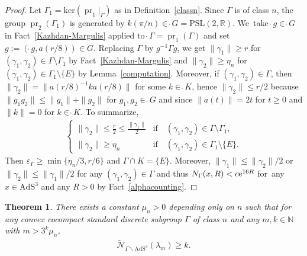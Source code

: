 \documentclass[10pt,a4paper]{amsart}
\numberwithin{equation}{section}
\newtheorem{Theorem}{Theorem}[section]
\begin{document}
\begin{proof}
Let $\Gamma_1=\mathrm{ker}(\operatorname{pr}_{1}|_{\Gamma})$
as in Definition~\ref{classn}.
Since $\Gamma$ is of class $n$,
the group $\operatorname{pr}_{2}(\Gamma_{1})$ is generated by
$k(\pi/n)\in \grave{\ }G=\mathrm{PSL}(2,\mathbb{R})$. We~take $\grave{\ }g \in \grave{\ }G$ in Fact~\ref{Kazhdan-Margulis} applied
to $\grave{\ }\Gamma=\operatorname{pr}_{1}(\Gamma)$ and
set $g:=(\grave{\ }g,a(r/8))\in G$.
Replacing $\Gamma$ by $g^{-1}\Gamma g$, we get
$\|\gamma_{1}\|\geq r$ for
$(\gamma_{1},\gamma_{2})\in\Gamma\setminus\Gamma_{1}$
by Fact~\ref{Kazhdan-Margulis} and
$\|\gamma_{2}\|\geq \eta_n$ for $(\gamma_1,\gamma_2)\in\Gamma_1\setminus\{E\}$
by Lemma~\ref{computation}.
Moreover, if $(\gamma_{1},\gamma_{2})\in\Gamma$, then
$\|\gamma_{2}\|=\|a(r/8)^{-1}ka(r/8)\|$ for some $k\in\grave{\ }K$,
hence $\|\gamma_{2}\|\leq r/2$ because
$\|g_{1}g_{2}\|\leq\|g_{1}\|+\|g_{2}\|$ for $g_{1},g_{2} \in \grave{\ }G$
and since
$\|a(t)\|=2t$ for $t\geq 0$ and $\|k\|=0$ for $k\in\grave{\ }K$.
To summarize,
\begin{gather*}
\begin{cases}
\|\gamma_{2}\|\leq \frac{r}{2}\leq\frac{\|\gamma_{1}\|}{2} &
\text{if}\quad (\gamma_{1},\gamma_{2})\in\Gamma\setminus\Gamma_{1},
\\[1ex]
\|\gamma_{2}\|\geq \eta_n &
\text{if}\quad(\gamma_{1},\gamma_{2})\in\Gamma_{1}\setminus\{E\}.
\end{cases}
\end{gather*}
Then $\varepsilon_{\Gamma}\geq\operatorname{min}\{\eta_n/3,r/6\}$
and $\Gamma\cap K=\{E\}$.
Moreover, $\|\gamma_{1}\|\leq\|\gamma_{2}\|/2$ or
$\|\gamma_{2}\|\leq\|\gamma_{1}\|/2$ for any $(\gamma_{1},\gamma_{2})\in\Gamma$
and thus $N_{\Gamma}(x,R)<c{\rm e}^{16R}$
for~any~$x\in \mathrm{AdS}^{3}$ and any $R>0$
by Fact~\ref{alphacounting}.
\end{proof}

\begin{Theorem}
\label{standard}
There exists a constant $\mu_{n}>0$ depending only on $n$ such that
for any convex cocompact standard discrete subgroup $\Gamma$ of class $n$
and any $m,k\in\mathbb{N}$ with $m>3^k\mu_{n}$,
\begin{gather*}
\widetilde{\mathcal{N}}_{\Gamma\backslash\mathrm{AdS}^{3}}(\lambda_{m})\geq k.
\end{gather*}
\end{Theorem}
\end{document}
